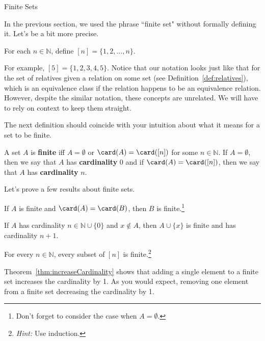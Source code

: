 \begin{section}{Finite Sets}

In the previous section, we used the phrase ``finite set" without formally defining it. Let's be a bit more precise.

\begin{definition}
For each $n\in \mathbb{N}$, define $[n]=\{1,2,\ldots,n\}$.
\end{definition}

For example, $[5]=\{1,2,3,4,5\}$.  Notice that our notation looks just like that for the set of relatives given a relation on some set (see Definition~\ref{def:relatives}), which is an equivalence class if the relation happens to be an equivalence relation.  However, despite the similar notation, these concepts are unrelated. We will have to rely on context to keep them straight.

The next definition should coincide with your intuition about what it means for a set to be finite.

\begin{definition}
A set $A$ is \textbf{finite} iff $A=\emptyset$ or $\card(A)=\card([n])$ for some $n\in\mathbb{N}$. If $A=\emptyset$, then we say that $A$ has \textbf{cardinality} 0 and if $\card(A)=\card([n])$, then we say that $A$ has \textbf{cardinality} $n$.
\end{definition}

Let's prove a few results about finite sets.

\begin{theorem}\label{thm:finiteSetsSameCardinality}
If $A$ is finite and $\card(A)=\card(B)$, then $B$ is finite.\footnote{Don't forget to consider the case when $A=\emptyset$.}
\end{theorem}

\begin{theorem}\label{thm:increaseCardinality}
If $A$ has cardinality $n\in\mathbb{N}\cup\{0\}$ and $x\notin A$, then $A\cup\{x\}$ is finite and has cardinality $n+1$.
\end{theorem}

\begin{theorem}\label{thm:subsetsFiniteSets}
For every $n\in\mathbb{N}$, every subset of $[n]$ is finite.\footnote{\emph{Hint:} Use induction.}
\end{theorem}

Theorem~\ref{thm:increaseCardinality} shows that adding a single element to a finite set increases the cardinality by 1. As you would expect, removing one element from a finite set decreasing the cardinality by 1.


\end{section}
